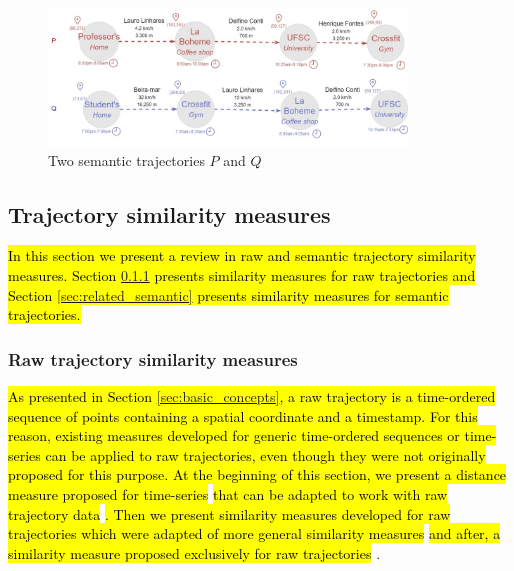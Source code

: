 \documentclass[12pt]{article}
\begin{document}
\begin{figure}[h]
\centering
\includegraphics[width=0.85\textwidth]{Related_Works/Semantic_trajectories.jpg}
\caption{\label{fig:related_semantic_trajes}Two semantic trajectories $P$ and $Q$}
\end{figure}

\subsection{Trajectory similarity measures} \label{sec:related_measures}

\hl{In this section we present a review in raw and semantic trajectory similarity measures. Section {\ref{sec:related_raw}} presents similarity measures for raw trajectories and Section {\ref{sec:related_semantic}} presents similarity measures for semantic trajectories.}

\subsubsection{Raw trajectory similarity measures} \label{sec:related_raw}
\hl{As presented in Section {\ref{sec:basic_concepts},} a raw trajectory is a time-ordered sequence of points containing a spatial coordinate and a timestamp. For this reason, existing measures developed for generic time-ordered sequences or time-series can be applied to raw trajectories, even though they were not originally proposed for this purpose. At the beginning of this section, we present a distance measure proposed for time-series }\cite{berndt1994using}\hl{ that can be adapted to work with raw trajectory data }\cite{ten2007multi}\hl{. Then we present similarity measures developed for raw trajectories which were adapted of more general similarity measures }\cite{eiter1994computing, Ding:2008:ESJ:1440463.1440989, vlachos2002discovering, Chen:2004:MLE:1316689.1316758, Chen:2005:RFS:1066157.1066213}\hl{ and after, a similarity measure proposed exclusively for raw trajectories }\cite{Furtado-UMS-2018}.

\end{document}
